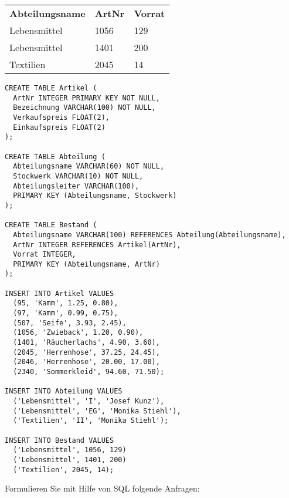 \documentclass{bschlangaul-aufgabe}
\begin{document}
\begin{tabular}{lll}
\textbf{Abteilungsname}  & \textbf{ArtNr} & \textbf{Vorrat} \\
Lebensmittel    & 1056  & 129    \\
Lebensmittel    & 1401  & 200    \\
Textilien       & 2045  & 14
\end{tabular}

\begin{verbatim}
CREATE TABLE Artikel (
  ArtNr INTEGER PRIMARY KEY NOT NULL,
  Bezeichnung VARCHAR(100) NOT NULL,
  Verkaufspreis FLOAT(2),
  Einkaufspreis FLOAT(2)
);

CREATE TABLE Abteilung (
  Abteilungsname VARCHAR(60) NOT NULL,
  Stockwerk VARCHAR(10) NOT NULL,
  Abteilungsleiter VARCHAR(100),
  PRIMARY KEY (Abteilungsname, Stockwerk)
);

CREATE TABLE Bestand (
  Abteilungsname VARCHAR(100) REFERENCES Abteilung(Abteilungsname),
  ArtNr INTEGER REFERENCES Artikel(ArtNr),
  Vorrat INTEGER,
  PRIMARY KEY (Abteilungsname, ArtNr)
);

INSERT INTO Artikel VALUES
  (95, 'Kamm', 1.25, 0.80),
  (97, 'Kamm', 0.99, 0.75),
  (507, 'Seife', 3.93, 2.45),
  (1056, 'Zwieback', 1.20, 0.90),
  (1401, 'Räucherlachs', 4.90, 3.60),
  (2045, 'Herrenhose', 37.25, 24.45),
  (2046, 'Herrenhose', 20.00, 17.00),
  (2340, 'Sommerkleid', 94.60, 71.50);

INSERT INTO Abteilung VALUES
  ('Lebensmittel', 'I', 'Josef Kunz'),
  ('Lebensmittel', 'EG', 'Monika Stiehl'),
  ('Textilien', 'II', 'Monika Stiehl');

INSERT INTO Bestand VALUES
  ('Lebensmittel', 1056, 129)
  ('Lebensmittel', 1401, 200)
  ('Textilien', 2045, 14);
\end{verbatim}

Formulieren Sie mit Hilfe von SQL folgende Anfragen:
\end{document}
